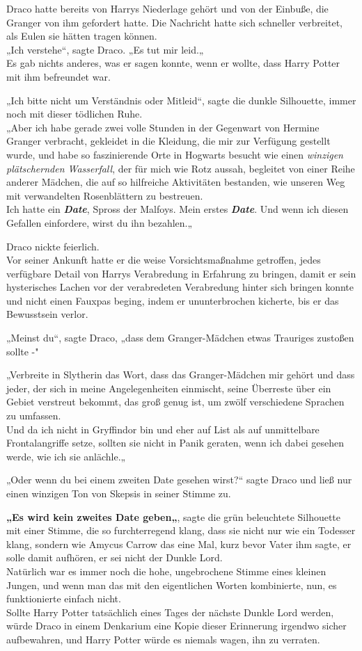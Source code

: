 {Draco hatte bereits von Harrys Niederlage gehört und von der Einbuße, die Granger von ihm gefordert hatte. Die Nachricht hatte sich schneller verbreitet, als Eulen sie hätten tragen können.\\ „Ich verstehe“, sagte Draco. „Es tut mir leid.„\\ Es gab nichts anderes, was er sagen konnte, wenn er wollte, dass Harry Potter mit ihm befreundet war.

„Ich bitte nicht um Verständnis oder Mitleid“, sagte die dunkle Silhouette, immer noch mit dieser tödlichen Ruhe.\\ „Aber ich habe gerade zwei volle Stunden in der Gegenwart von Hermine Granger verbracht, gekleidet in die Kleidung, die mir zur Verfügung gestellt wurde, und habe so faszinierende Orte in Hogwarts besucht wie einen \emph{winzigen plätschernden Wasserfall}, der für mich wie Rotz aussah, begleitet von einer Reihe anderer Mädchen, die auf so hilfreiche Aktivitäten bestanden, wie unseren Weg mit verwandelten Rosenblättern zu bestreuen.\\ Ich hatte ein \textbf{\emph{Date}}, Spross der Malfoys. Mein erstes \textbf{\emph{Date}}. Und wenn ich diesen Gefallen einfordere, wirst du ihn bezahlen.„

Draco nickte feierlich.\\ Vor seiner Ankunft hatte er die weise Vorsichtsmaßnahme getroffen, jedes verfügbare Detail von Harrys Verabredung in Erfahrung zu bringen, damit er sein hysterisches Lachen vor der verabredeten Verabredung hinter sich bringen konnte und nicht einen Fauxpas beging, indem er ununterbrochen kicherte, bis er das Bewusstsein verlor.

„Meinst du“, sagte Draco, „dass dem Granger-Mädchen etwas Trauriges zustoßen sollte -"

„Verbreite in Slytherin das Wort, dass das Granger-Mädchen mir gehört und dass jeder, der sich in meine Angelegenheiten einmischt, seine Überreste über ein Gebiet verstreut bekommt, das groß genug ist, um zwölf verschiedene Sprachen zu umfassen.\\ Und da ich nicht in Gryffindor bin und eher auf List als auf unmittelbare Frontalangriffe setze, sollten sie nicht in Panik geraten, wenn ich dabei gesehen werde, wie ich sie anlächle.„

„Oder wenn du bei einem zweiten Date gesehen wirst?“ sagte Draco und ließ nur einen winzigen Ton von Skepsis in seiner Stimme zu.

\textbf{„Es wird kein zweites Date geben„}, sagte die grün beleuchtete Silhouette mit einer Stimme, die so furchterregend klang, dass sie nicht nur wie ein Todesser klang, sondern wie Amycus Carrow das eine Mal, kurz bevor Vater ihm sagte, er solle damit aufhören, er sei nicht der Dunkle Lord.\\ Natürlich war es immer noch die hohe, ungebrochene Stimme eines kleinen Jungen, und wenn man das mit den eigentlichen Worten kombinierte, nun, es funktionierte einfach nicht.\\ Sollte Harry Potter tatsächlich eines Tages der nächste Dunkle Lord werden, würde Draco in einem Denkarium eine Kopie dieser Erinnerung irgendwo sicher aufbewahren, und Harry Potter würde es niemals wagen, ihn zu verraten.

}
